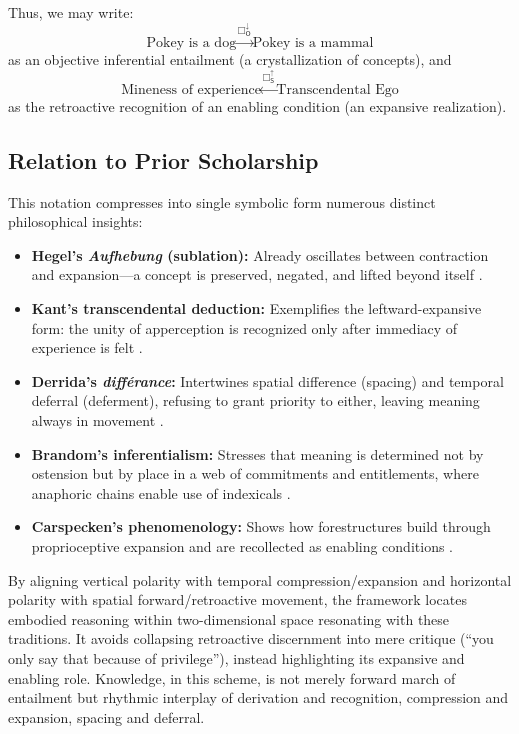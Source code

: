 \documentclass[12pt]{book}
\newcommand{\SBoxUp}{\Box_{\mathsf{S}}^{\uparrow}}
\newcommand{\OBoxDown}{\Box_{\mathsf{O}}^{\downarrow}}
\begin{document}
Thus, we may write:
\[
\text{Pokey is a dog} \xrightarrow{\,\OBoxDown\,} \text{Pokey is a mammal}
\]
as an objective inferential entailment (a crystallization of concepts), and
\[
\text{Mineness of experience} \xleftarrow{\,\SBoxUp\,} \text{Transcendental Ego}
\]
as the retroactive recognition of an enabling condition (an expansive realization).

\subsection{Relation to Prior Scholarship}

This notation compresses into single symbolic form numerous distinct philosophical insights:

\begin{itemize}
\item \textbf{Hegel's \textit{Aufhebung} (sublation):} Already oscillates between contraction and expansion---a concept is preserved, negated, and lifted beyond itself \parencite{hegel1977phenomenology}.
\item \textbf{Kant's transcendental deduction:} Exemplifies the leftward-expansive form: the unity of apperception is recognized only after immediacy of experience is felt \parencite{Kant1781}.
\item \textbf{Derrida's \textit{différance}:} Intertwines spatial difference (spacing) and temporal deferral (deferment), refusing to grant priority to either, leaving meaning always in movement \parencite{Derrida:1973}.
\item \textbf{Brandom's inferentialism:} Stresses that meaning is determined not by ostension but by place in a web of commitments and entitlements, where anaphoric chains enable use of indexicals \parencite{brandom1994making,Brandom2008}.
\item \textbf{Carspecken's phenomenology:} Shows how forestructures build through proprioceptive expansion and are recollected as enabling conditions \parencite{Carspecken1999}.
\end{itemize}

By aligning vertical polarity with temporal compression/expansion and horizontal polarity with spatial forward/retroactive movement, the framework locates embodied reasoning within two-dimensional space resonating with these traditions. It avoids collapsing retroactive discernment into mere critique (``you only say that because of privilege''), instead highlighting its expansive and enabling role. Knowledge, in this scheme, is not merely forward march of entailment but rhythmic interplay of derivation and recognition, compression and expansion, spacing and deferral.
\end{document}
